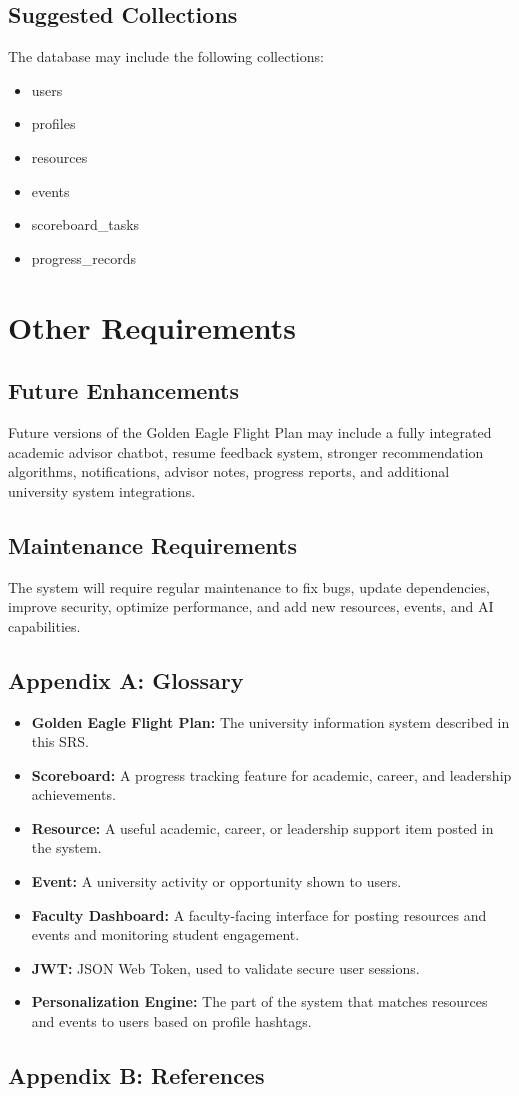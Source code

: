 \documentclass{scrreprt}
\begin{document}
\section{Suggested Collections}
The database may include the following collections:

\begin{itemize}
    \item users
    \item profiles
    \item resources
    \item events
    \item scoreboard\_tasks
    \item progress\_records
\end{itemize}

\chapter{Other Requirements}

\section{Future Enhancements}
Future versions of the Golden Eagle Flight Plan may include a fully integrated academic advisor chatbot, resume feedback system, stronger recommendation algorithms, notifications, advisor notes, progress reports, and additional university system integrations.

\section{Maintenance Requirements}
The system will require regular maintenance to fix bugs, update dependencies, improve security, optimize performance, and add new resources, events, and AI capabilities.

\section{Appendix A: Glossary}
\begin{itemize}
    \item \textbf{Golden Eagle Flight Plan:} The university information system described in this SRS.
    \item \textbf{Scoreboard:} A progress tracking feature for academic, career, and leadership achievements.
    \item \textbf{Resource:} A useful academic, career, or leadership support item posted in the system.
    \item \textbf{Event:} A university activity or opportunity shown to users.
    \item \textbf{Faculty Dashboard:} A faculty-facing interface for posting resources and events and monitoring student engagement.
    \item \textbf{JWT:} JSON Web Token, used to validate secure user sessions.
    \item \textbf{Personalization Engine:} The part of the system that matches resources and events to users based on profile hashtags.
\end{itemize}

\section{Appendix B: References}
\end{document}
